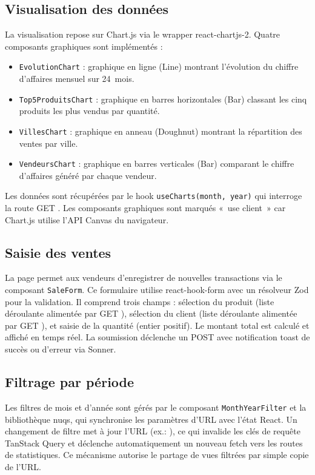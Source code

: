 \documentclass[11pt,a4paper]{report}
\begin{document}
\subsection{Visualisation des données}
La visualisation repose sur Chart.js via le wrapper react-chartjs-2. Quatre
composants graphiques sont implémentés :
\begin{itemize}
  \item \texttt{EvolutionChart} : graphique en ligne (Line) montrant l'évolution
        du chiffre d'affaires mensuel sur 24~mois.
  \item \texttt{Top5ProduitsChart} : graphique en barres horizontales (Bar)
        classant les cinq produits les plus vendus par quantité.
  \item \texttt{VillesChart} : graphique en anneau (Doughnut) montrant la
        répartition des ventes par ville.
  \item \texttt{VendeursChart} : graphique en barres verticales (Bar) comparant
        le chiffre d'affaires généré par chaque vendeur.
\end{itemize}
Les données sont récupérées par le hook \texttt{useCharts(month, year)} qui
interroge la route GET . Les composants graphiques sont
marqués «~use client~» car Chart.js utilise l'API Canvas du navigateur.

\subsection{Saisie des ventes}
La page  permet aux vendeurs d'enregistrer de nouvelles
transactions via le composant \texttt{SaleForm}. Ce formulaire utilise
react-hook-form avec un résolveur Zod pour la validation. Il comprend trois
champs : sélection du produit (liste déroulante alimentée par
GET ), sélection du client (liste déroulante alimentée par
GET ), et saisie de la quantité (entier positif). Le montant
total est calculé et affiché en temps réel. La soumission déclenche un POST
 avec notification toast de succès ou d'erreur via Sonner.

\subsection{Filtrage par période}
Les filtres de mois et d'année sont gérés par le composant
\texttt{MonthYearFilter} et la bibliothèque nuqs, qui synchronise les paramètres
d'URL avec l'état React. Un changement de filtre met à jour l'URL
(ex.: ), ce qui invalide les clés de requête TanStack
Query et déclenche automatiquement un nouveau fetch vers les routes de
statistiques. Ce mécanisme autorise le partage de vues filtrées par simple copie
de l'URL.
\end{document}
